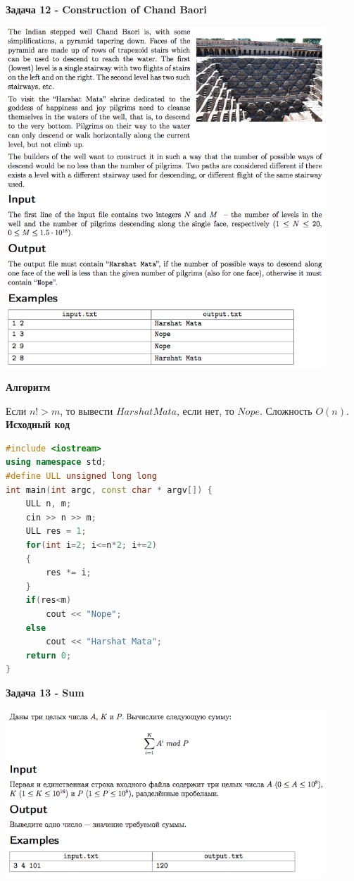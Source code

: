 \documentclass[a4paper,12pt]{article}
\begin{document}
\newpage
\textbf{{\large Задача 12 - Construction of Chand Baori}}

\begin{center}
\includegraphics[width=0.9\textwidth]{OC_Siberia/OC_Siberia_12.png}\\ [1cm]
\end{center}
\newpage

\textbf{{\large Алгоритм}}

Если $n! > m$, то вывести $Harshat Mata$, если нет, то $Nope$. Сложность $O(n)$. \\

\textbf{{\large Исходный код}} \\
\begin{lstlisting}[language=C++]
#include <iostream>
using namespace std;
#define ULL unsigned long long
int main(int argc, const char * argv[]) {
    ULL n, m;
    cin >> n >> m;
    ULL res = 1;
    for(int i=2; i<=n*2; i+=2)
    {
        res *= i;
    }
    if(res<m)
        cout << "Nope";
    else
        cout << "Harshat Mata";
    return 0;
}
\end{lstlisting}

\newpage
\textbf{{\large Задача 13 - Sum}}

\begin{center}
\includegraphics[width=0.9\textwidth]{OC_Siberia/OC_Siberia_13.png}\\ [1cm]
\end{center}
\end{document}
